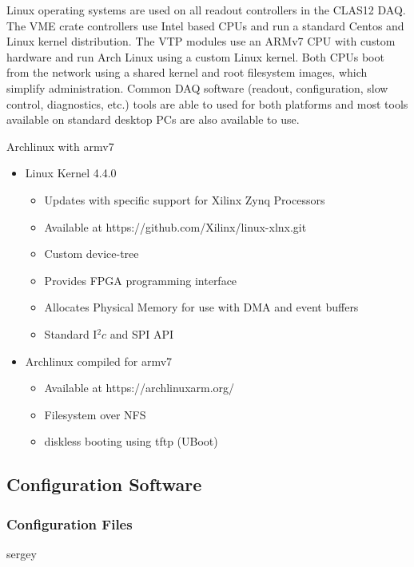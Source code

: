 Linux operating systems are used on all readout controllers in the CLAS12 DAQ. The VME crate controllers use Intel based CPUs and run a standard Centos and Linux kernel distribution. The VTP modules use an ARMv7 CPU with custom hardware and run Arch Linux using a custom Linux kernel. Both CPUs boot from the network using a shared kernel and root filesystem images, which simplify administration. Common DAQ software (readout, configuration, slow control, diagnostics, etc.) tools are able to used for both platforms and most tools available on standard desktop PCs are also available to use.

Archlinux with armv7

\begin{itemize}
\item Linux Kernel 4.4.0
  \begin{itemize}
  \item Updates with specific support for Xilinx Zynq Processors
  \item Available at https://github.com/Xilinx/linux-xlnx.git
  \item Custom device-tree
  \item Provides FPGA programming interface
  \item Allocates Physical Memory for use with DMA and event buffers
  \item Standard I$^2c$ and SPI API
  \end{itemize}

\item Archlinux compiled for armv7
  \begin{itemize}
  \item Available at https://archlinuxarm.org/
  \item Filesystem over NFS
  \item diskless booting using tftp (UBoot)
  \end{itemize}
\end{itemize}


\subsection{Configuration Software}

\subsubsection{Configuration Files} sergey

